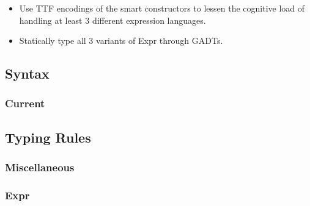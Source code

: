 \begin{itemize}

      \item Use TTF encodings of the smart constructors to lessen the cognitive
            load of handling at least 3 different expression languages.

      \item Statically type all 3 variants of Expr through GADTs.

\end{itemize}

\subsection{Syntax}

\subsubsection{Current}



\subsection{Typing Rules}

\subsubsection{Miscellaneous}



\subsubsection{Expr}


